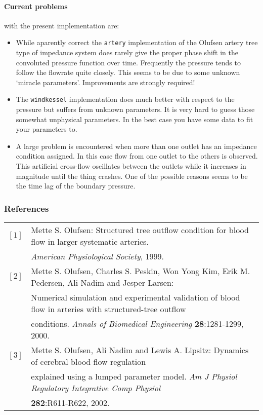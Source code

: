 \paragraph{Current problems} with the present implementation are:
\begin{itemize}
  \item While aparently correct the \texttt{artery} implementation of the Olufsen
        artery tree type of impedance system does rarely give the proper phase 
        shift in the convoluted pressure function over time. Frequently the pressure
        tends to follow the flowrate quite closely. This seems to be due to some 
        unknown `miracle parameters'. Improvements are strongly required!
  \item The \texttt{windkessel} implementation does much better with respect to 
        the pressure but suffers from unknown parameters. It is very hard to guess 
        those somewhat unphysical parameters. In the best case you have some data to 
        fit your parameters to.
  \item A large problem is encountered when more than one outlet has an impedance
        condition assigned. In this case flow from one outlet to the others is 
        observed. This artificial cross-flow oscillates between the outlets while 
        it increases in magnitude until the thing crashes.
        One of the possible reasons seems to be the time lag of the boundary
        pressure.
\end{itemize}

\subsubsection*{References}
%
\begin{tabular}{cl}
$[1]$ & Mette S. Olufsen: Structured tree outflow condition for blood flow in larger
systematic arteries.\\ & \textit{American Physiological Society}, 1999. \\
$[2]$ &
Mette S. Olufsen, Charles S. Peskin, Won Yong Kim, Erik M. Pedersen, Ali Nadim and Jesper Larsen:\\
&Numerical simulation and experimental validation of blood flow in arteries with structured-tree
outflow\\ & conditions. \textit{Annals of Biomedical Engineering} \textbf{28}:1281-1299, 2000. \\
$[3]$ &
Mette S. Olufsen, Ali Nadim and Lewis A. Lipsitz: Dynamics of cerebral blood flow regulation \\
&explained using a lumped parameter model. \textit{Am J Physiol Regulatory Integrative Comp Physiol}\\
&\textbf{282}:R611-R622, 2002.
\end{tabular}


